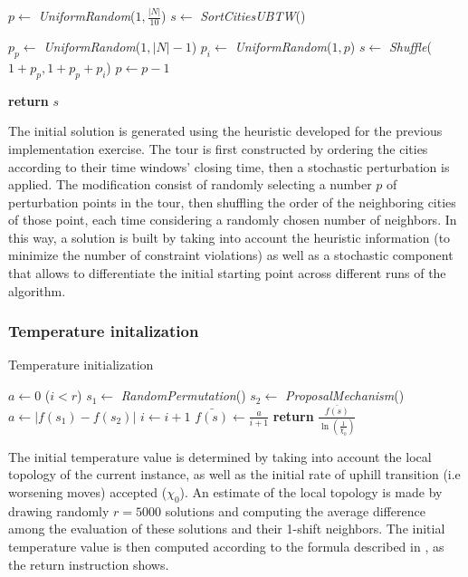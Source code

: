 \begin{homeworkProblem}
\begin{algorithm}
\begin{algorithmic}
\State $p \gets$ \emph{UniformRandom}($1,\frac{|N|}{10}$) 
\State $s \gets$ \emph{SortCitiesUBTW}() 	

  \State $p_p \gets$ \emph{UniformRandom}($1,|N|-1$) 
  \State $p_i \gets$ \emph{UniformRandom}($1,p$) 
  \State $s \gets$ \emph{Shuffle}($1+p_p,1+p_p+p_i$) 
  \State $p \gets p-1$
\EndWhile	

\State \textbf{return} $s$

\EndProcedure    
\end{algorithmic}
\end{algorithm}

The initial solution is generated using the heuristic developed for the previous implementation exercise.
The tour is first constructed by ordering the cities according to their time windows' closing time, then a stochastic perturbation is applied.
The modification consist of randomly selecting a number $p$ of perturbation points in the tour, then shuffling the order of the neighboring cities of those point, each time considering a randomly chosen number of neighbors.
In this way, a solution is built by taking into account the heuristic information (to minimize the number of constraint violations) as well as a stochastic component that allows to differentiate the initial starting point across different runs of the algorithm.

\subsubsection{Temperature initalization}
\begin{algorithm}
\caption{Temperature initialization}
\label{saTInit}
\begin{algorithmic}
  \State $a \gets 0$
  \While($i < r$)
    \State $s_1 \gets$ \emph{RandomPermutation}()
    \State $s_2 \gets$ \emph{ProposalMechanism}()
    \State $a \gets |f(s_1)-f(s_2)|$
    \State $i \gets i + 1$
  \EndWhile
  \State $\bar{f(s)} \gets \frac{a}{i+1}$
  \State \textbf{return} $\frac{\bar{f(s)}}{\ln(\frac{1}{\chi_0})}$
\EndProcedure
\end{algorithmic}
\end{algorithm}

The initial temperature value is determined by taking into account the local topology of the current instance, as well as the initial rate of uphill transition (i.e worsening moves) accepted ($\chi_0$).
An estimate of the local topology is made by drawing randomly $r=5000$ solutions and computing the average difference among the evaluation of these solutions and their 1-shift neighbors.
The initial temperature value is then computed according to the formula described in \cite{ohlmann2007compressed}, as the return instruction shows.


\end{homeworkProblem}
